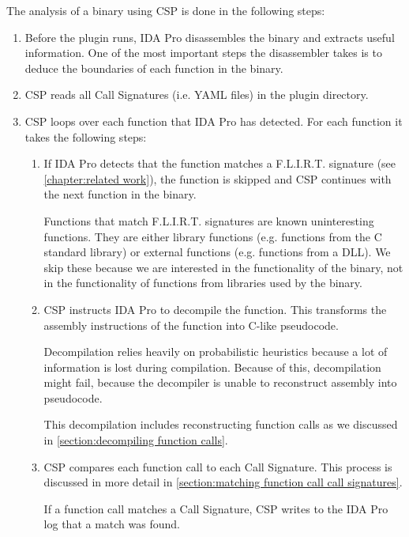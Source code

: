 The analysis of a binary using CSP is done in the following steps:
\begin{enumerate}
    \item Before the plugin runs, IDA Pro disassembles the binary and extracts useful information. One of the most important steps the disassembler takes is to deduce the boundaries of each function in the binary.

    \item CSP reads all Call Signatures (i.e. YAML files) in the plugin directory.

    \item CSP loops over each function that IDA Pro has detected. For each function it takes the following steps:
    \begin{enumerate}
        \item If IDA Pro detects that the function matches a F.L.I.R.T. signature (see \autoref{chapter:related work}), the function is skipped and CSP continues with the next function in the binary.

        Functions that match F.L.I.R.T. signatures are known uninteresting functions. They are either library functions (e.g. functions from the C standard library) or external functions (e.g. functions from a DLL). We skip these because we are interested in the functionality of the binary, not in the functionality of functions from libraries used by the binary.

        \item CSP instructs IDA Pro to decompile the function. This transforms the assembly instructions of the function into C-like pseudocode.

        Decompilation relies heavily on probabilistic heuristics because a lot of information is lost during compilation. Because of this, decompilation might fail, because the decompiler is unable to reconstruct assembly into pseudocode.

        This decompilation includes reconstructing function calls as we discussed in \autoref{section:decompiling function calls}.

        \item CSP compares each function call to each Call Signature. This process is discussed in more detail in \autoref{section:matching function call call signatures}.

        If a function call matches a Call Signature, CSP writes to the IDA Pro log that a match was found.
    \end{enumerate}
\end{enumerate}

